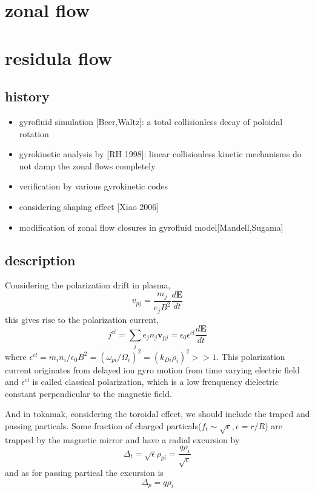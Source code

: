 \documentclass[11pt,a4paper]{article}
\begin{document}
	
	
\newpage	
\section{zonal flow}

\newpage
\section{residula flow}	

	\subsection{history}
	\begin{itemize}
		\item gyrofluid simulation [Beer,Waltz]: a total collisionless decay of poloidal rotation
		\item gyrokinetic analysis by [RH 1998]: linear collisionless kinetic mechanisms do not damp the zonal flows completely
		\item verification by various gyrokinetic codes
		\item considering shaping effect [Xiao 2006]
		\item modification of zonal flow closures in gyrofluid model[Mandell,Sugama]
	\end{itemize}
	
	\subsection{description}
	Considering the polarization drift in plasma, 
\begin{equation}
	v_{pj}=\frac{m_j}{e_jB^2}\frac{d\pmb{E}}{dt}
	\end{equation}
	this gives rise to the polarization current,
	\begin{equation}
	j^{cl}=\sum_{j}{e_jn_j\pmb{v}_{pj}}=\epsilon_0\epsilon^{cl}\frac{d\pmb{E}}{dt}
	\end{equation}
	where $\epsilon^{cl}=m_in_i/\epsilon_0B^2=(\omega_{pi}/\Omega_i)^2=(k_{Di}\rho_i)^2>>1$. This polarization current originates from delayed ion gyro motion from time varying electric field and $\epsilon^{cl}$ is called classical polarization, which is a low frenquency dielectric constant perpendicular to the magnetic field.

	And in tokamak, considering the toroidal effect, we should include the traped and passing particals. Some fraction of charged particals($f_t\sim\sqrt{\epsilon},\epsilon=r/R$) are trapped by the magnetic mirror and have a radial excursion by 
	\begin{equation}
		\Delta_t=\sqrt{\epsilon}\rho_{pi}=\frac{q\rho_i}{\sqrt{\epsilon}}
	\end{equation}
	and as for passing partical the excursion is
	\begin{equation}
		\Delta_p=q\rho_i
	\end{equation}
	
\end{document}

